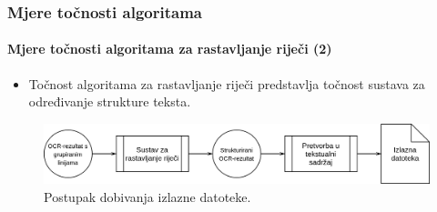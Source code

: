 \documentclass{beamer}
\begin{document}
\begin{frame}
\frametitle{Mjere točnosti algoritama}
\framesubtitle{Mjere točnosti algoritama za rastavljanje riječi (2)}
\begin{itemize}
    \item Točnost algoritama za rastavljanje riječi predstavlja točnost
          sustava za određivanje strukture teksta.
\end{itemize}
\begin{figure}[htb]
    \centering
    \includegraphics[width=\textwidth]{images/sustav-05.png}
    \caption{Postupak dobivanja izlazne datoteke.}
    \label{fig:sustav-05}
\end{figure}
\end{frame}
\end{document}
